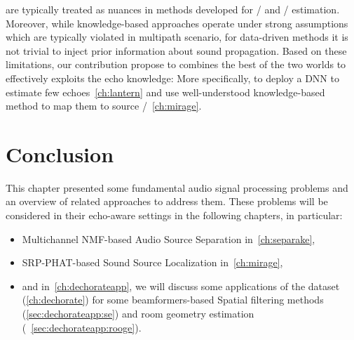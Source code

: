  are typically treated as nuances in methods developed for \SSL/ and \DOAs/ estimation.
Moreover, while knowledge-based approaches operate under strong assumptions which are typically violated in multipath scenario,
for data-driven methods it is not trivial to inject prior information about sound propagation.
Based on these limitations, our contribution propose to combines the best of the two worlds to effectively exploits the echo knowledge:
More specifically, to deploy a \ac{DNN} to estimate few echoes~\cref{ch:lantern} and use well-understood knowledge-based method to map them to source \DOAs/~\cref{ch:mirage}.

\section{Conclusion}\label{sec:application:conclusion}
This chapter presented some fundamental audio signal processing problems and an overview of related approaches to address them.
These problems will be considered in their echo-aware settings in the following chapters, in particular:
\begin{itemize}
    \item Multichannel NMF-based Audio Source Separation in~\cref{ch:separake},
    \item SRP-PHAT-based Sound Source Localization in~\cref{ch:mirage},
    \item and in~\cref{ch:dechorateapp}, we will discuss some applications of the  dataset (\cref{ch:dechorate}) for some beamformers-based Spatial filtering methods (\cref{sec:dechorateapp:se})
            and room geometry estimation (~\cref{sec:dechorateapp:rooge}).
\end{itemize}

